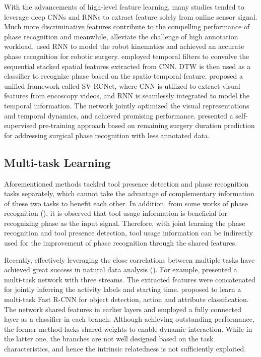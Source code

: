 \documentclass{elsarticle}
\begin{document}
With the advancements of high-level feature learning, many studies tended to leverage deep CNNs and RNNs to extract feature solely from online sensor signal.
Much more discriminative features contribute to the compelling performance of phase recognition and meanwhile, alleviate the challenge of high annotation workload.
\cite{dipietro2016recognizing} used RNN to model the robot kinematics and achieved an accurate phase recognition for robotic surgery.
\cite{lea2016surgical} employed temporal filters to convolve the sequential stacked spatial features extracted from CNN. DTW is then used as a classifier to recognize phase based on the spatio-temporal feature.
\cite{jin2018sv} proposed a unified framework called SV-RCNet, where CNN is utilized to extract visual features from encoscopy videos, and RNN is seamlessly integrated to model the temporal information. 
The network jointly optimized the visual representations and temporal dynamics, and achieved promising performance.
\cite{yengera2018less} presented a self-supervised pre-training approach based on remaining surgery duration prediction for addressing surgical phase recognition with less annotated data.







\subsection{Multi-task Learning}

Aforementioned methods tackled tool presence detection and phase recognition tasks separately, which cannot take the advantage of complementary information of these two tasks to benefit each other.
In addition, from some works of phase recognition (\cite{blum2010modeling,padoy2012statistical,lalys2013automatic,yu2019assessment}), it is observed that tool usage information is beneficial for recognizing phase as the input signal.
Therefore, with joint learning the phase recognition and tool presence detection, tool usage information can be indirectly used for the improvement of phase recognition through the shared features.



Recently, effectively leveraging the close correlations between multiple tasks have achieved great success in natural data analysis (\cite{mahmud2017joint,hinami2017joint,gebru2017fine,liu2017hierarchical}).
For example, \cite{mahmud2017joint} presented a multi-task network with three streams. The extracted features were concatenated for jointly inferring the activity labels and starting time.
\cite{hinami2017joint} proposed to learn a multi-task Fast R-CNN for object detection, action and attribute classification. The network shared features in earlier layers and employed a fully connected layer as a classifier in each branch.
Although achieving outstanding performance, the former method lacks shared weights to enable dynamic interaction.
While in the latter one, the branches are not well designed based on the task characteristics, and hence the intrinsic relatedness is not sufficiently exploited. 
\end{document}
